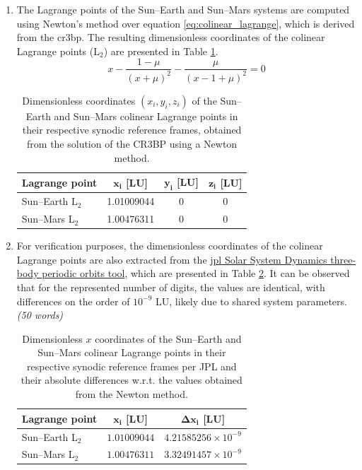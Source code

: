 \documentclass[a4paper,12pt]{article}
\begin{document}
\begin{enumerate}
    \item[\textbf{1.1a}] The Lagrange points of the Sun--Earth and Sun--Mars systems are computed using Newton's method over equation \eqref{eq:colinear_lagrange}, which is derived from the \acrfull{cr3bp}. The resulting dimensionless coordinates of the colinear Lagrange points (L$_2$) are presented in Table \ref{tab:lagrange_points}.
    \begin{equation}
        \label{eq:colinear_lagrange}
        x - \frac{1-\mu}{(x+\mu)^2} - \frac{\mu}{(x-1+\mu)^2} = 0
    \end{equation}
    \vspace{1em}
    \begin{table}[htbp]
        \centering
        \caption{Dimensionless coordinates $(x_i, y_i, z_i)$ of the Sun--Earth and Sun--Mars
        colinear Lagrange points in their respective synodic reference frames, obtained
        from the solution of the CR3BP using a Newton method.}
        \label{tab:lagrange_points}
        \begin{tabular}{lccc}
            \toprule
            \textbf{Lagrange point} & $\bm{x_i}$ [LU] & $\bm{y_i}$ [LU] & $\bm{z_i}$ [LU]\\
            \midrule
            Sun--Earth L$_2$ & 1.01009044 & 0 & 0 \\
            Sun--Mars L$_2$  & 1.00476311 & 0 & 0 \\
            \bottomrule
        \end{tabular}
    \end{table}
    
    \item[\textbf{1.1b}] For verification purposes, the dimensionless coordinates of the colinear Lagrange points are 
    also extracted from the \href{https://ssd.jpl.nasa.gov/tools/periodic_orbits.html\#/periodic}{\acrfull{jpl} Solar System 
    Dynamics three-body periodic orbits tool}, which are presented in Table \ref{tab:lagrange_points_jpl}.
    It can be observed that for the represented number of digits, the values are identical, with differences on the 
    order of $10^{-9}$ LU, likely due to shared system parameters. \textit{(50 words)}
    \vspace{1em}
    \begin{table}[htbp]
        \centering
        \caption{Dimensionless $x$ coordinates of the Sun--Earth and Sun--Mars
        colinear Lagrange points in their respective synodic reference frames per JPL and their absolute differences w.r.t. the values obtained from the Newton method.}
        \label{tab:lagrange_points_jpl}
        \begin{tabular}{lcc}
            \toprule
            \textbf{Lagrange point} & $\bm{x_i}$ [LU]& $\bm{\Delta x_i}$ [LU] \\
            \midrule
            Sun--Earth L$_2$ & $1.01009044$ & $4.21585256 \times 10^{-9}$ \\
            Sun--Mars L$_2$  & $1.00476311$ & $3.32491457 \times 10^{-9}$ \\
            \bottomrule
        \end{tabular}
    \end{table}


\end{enumerate}
\end{document}
